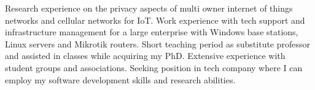 


Research experience on the privacy aspects of multi owner internet of things networks and cellular networks for IoT.
Work experience with tech support and infrastructure management for a large enterprise with Windows base stations, Linux servers and Mikrotik routers.
Short teaching period as substitute professor and assisted in classes while acquiring my PhD.
Extensive experience with student groups and associations.
Seeking position in tech company where I can employ my software development skills and research abilities.
